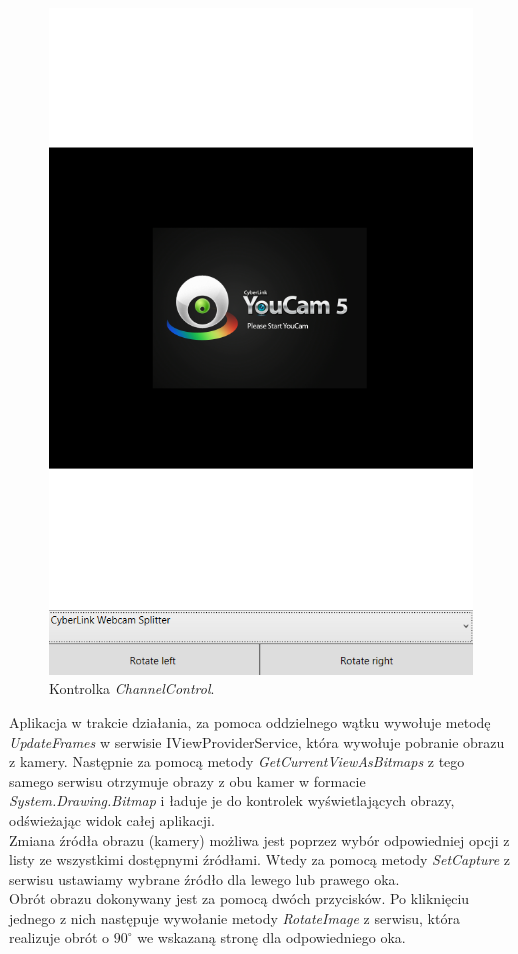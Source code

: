 \documentclass[a4paper,11pt,twoside]{report}
\theoremstyle{definition}
\begin{document}
\begin{description}
\begin{figure}[h]
\centering
\includegraphics[scale=0.3]{channelcontrol_screen}
\caption[Widok aplikacji]{Kontrolka \textit{ChannelControl}.}
\end{figure}

Aplikacja w trakcie działania, za pomoca oddzielnego wątku wywołuje metodę \textit{UpdateFrames} w serwisie {IViewProviderService}, która wywołuje pobranie obrazu z kamery. Następnie za pomocą metody \textit{GetCurrentViewAsBitmaps} z tego samego serwisu otrzymuje obrazy z obu kamer w formacie \textit{System.Drawing.Bitmap} i ładuje je do kontrolek wyświetlających obrazy, odświeżając widok całej aplikacji. \\
Zmiana źródła obrazu (kamery) możliwa jest poprzez wybór odpowiedniej opcji z listy ze wszystkimi dostępnymi źródłami. Wtedy za pomocą metody \textit{SetCapture} z serwisu ustawiamy wybrane źródło dla lewego lub prawego oka. \\
Obrót obrazu dokonywany jest za pomocą dwóch przycisków. Po kliknięciu jednego z nich następuje wywołanie metody \textit{RotateImage} z serwisu, która realizuje obrót o $90^\circ$ we wskazaną stronę dla odpowiedniego oka.


\end{description}
\end{document}
